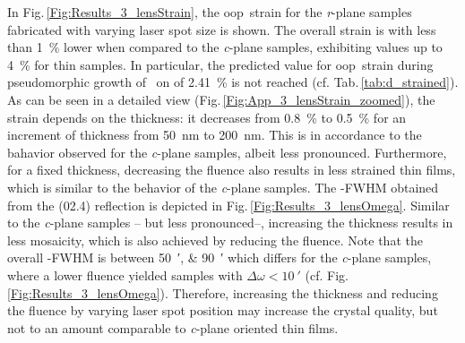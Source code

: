In Fig.\,\ref{Fig:Results_3_lensStrain}, the \gls{oop}\ strain for the \textit{r}-plane samples fabricated with varying laser spot size is shown.
The overall strain is with less than \qty{1}{\percent} lower when compared to the \textit{c}-plane samples, exhibiting values up to \qty{4}{\percent} for thin samples.
In particular, the predicted value for \gls{oop}\ strain during pseudomorphic growth of \cro\ on  of \qty{2.41}{\percent} is not reached (cf. Tab.\,\ref{tab:d_strained}).
As can be seen in a detailed view (Fig.\,\ref{Fig:App_3_lensStrain_zoomed}), the strain depends on the thickness:
it decreases from \qty{0.8}{\percent} to \qty{0.5}{\percent} for an increment of thickness from \qty{50}{\nm} to \qty{200}{\nm}.
This is in accordance to the bahavior observed for the \textit{c}-plane samples, albeit less pronounced.
Furthermore, for a fixed thickness, decreasing the fluence also results in less strained thin films, which is similar to the behavior of the \textit{c}-plane samples.
The \textomega-FWHM obtained from the (02.4) reflection is depicted in Fig.\,\ref{Fig:Results_3_lensOmega}.
Similar to the \textit{c}-plane samples -- but less pronounced--, increasing the thickness results in less mosaicity, which is also achieved by reducing the fluence.
Note that the overall \textomega-FWHM is between \qtylist{50;90}{\arcminute} which differs for the \textit{c}-plane samples, where a lower fluence yielded samples with $\Delta\omega<\qty{10}{\arcminute}$ (cf. Fig.\,\ref{Fig:Results_3_lensOmega}).
Therefore, increasing the thickness and reducing the fluence by varying laser spot position may increase the crystal quality, but not to an amount comparable to \textit{c}-plane oriented thin films.
